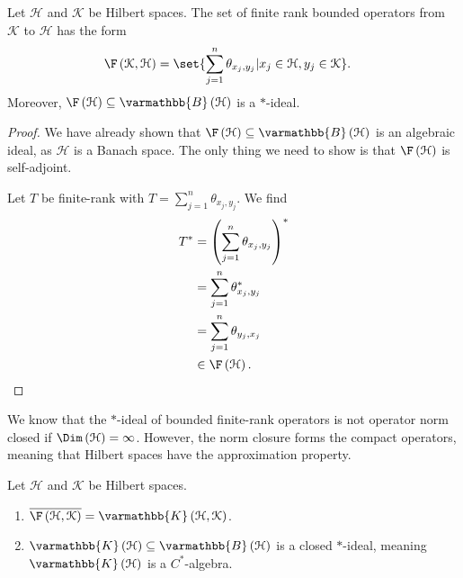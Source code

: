 \documentclass[10pt]{mypackage}
\renewcommand*{\mathbb}[1]{\varmathbb{#1}}
\newcommand{\B}{\mathbb{B}}
\begin{document}
\begin{corollary}
  Let $\mathcal{H}$ and $\mathcal{K}$ be Hilbert spaces. The set of finite rank bounded operators from $\mathcal{K}$ to $\mathcal{H}$ has the form
  \begin{align*}
    \F\left(\mathcal{K},\mathcal{H}\right) &= \set{\sum_{j=1}^{n}\theta_{x_j,y_j} | x_j\in \mathcal{H},y_j\in \mathcal{K}}.
  \end{align*}
  Moreover, $\F\left(\mathcal{H}\right)\subseteq \B\left(\mathcal{H}\right)$ is a $\ast$-ideal.
\end{corollary}
\begin{proof}
  We have already shown that $\F\left(\mathcal{H}\right)\subseteq \B\left(\mathcal{H}\right)$ is an algebraic ideal, as $\mathcal{H}$ is a Banach space. The only thing we need to show is that $\F\left(\mathcal{H}\right)$ is self-adjoint.\newline

  Let $T$ be finite-rank with $T = \sum_{j=1}^{n}\theta_{x_j,y_j}$. We find
  \begin{align*}
    T^{\ast} &= \left(\sum_{j=1}^{n}\theta_{x_j,y_j}\right)^{\ast}\\
             &= \sum_{j=1}^{n}\theta_{x_j,y_j}^{\ast}\\
             &= \sum_{j=1}^{n}\theta_{y_j,x_j}\\
             &\in \F\left(\mathcal{H}\right).
  \end{align*}
\end{proof}
We know that the $\ast$-ideal of bounded finite-rank operators is not operator norm closed if $\Dim\left(\mathcal{H}\right) = \infty$. However, the norm closure forms the compact operators, meaning that Hilbert spaces have the approximation property.
\begin{theorem}
  Let $\mathcal{H}$ and $\mathcal{K}$ be Hilbert spaces.
  \begin{enumerate}[(1)]
    \item $\overline{\F\left(\mathcal{H},\mathcal{K}\right)} = \mathbb{K}\left(\mathcal{H},\mathcal{K}\right)$.
    \item $\mathbb{K}\left(\mathcal{H}\right)\subseteq \B\left(\mathcal{H}\right)$ is a closed $\ast$-ideal, meaning $\mathbb{K}\left(\mathcal{H}\right)$ is a $C^{\ast}$-algebra.
  \end{enumerate}
\end{theorem}
\end{document}
